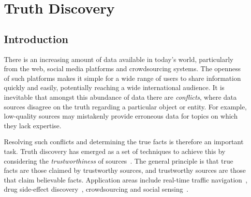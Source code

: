 \chapter{Truth Discovery}
\label{chapter_td}

\section{Introduction}
\label{td_sec_introduction}

There is an increasing amount of data available in today's world, particularly
from the web, social media platforms and crowdsourcing systems. The openness of
such platforms makes it simple for a wide range of users to share information
quickly and easily, potentially reaching a wide international audience. It is
inevitable that amongst this abundance of data there are \emph{conflicts},
where data sources disagree on the truth regarding a particular object or
entity. For example, low-quality sources may mistakenly provide erroneous data
for topics on which they lack expertise.

Resolving such conflicts and determining the true facts is therefore an
important task. Truth discovery has emerged as a set of techniques to achieve
this by considering the \emph{trustworthiness} of
sources~\cite{li_survey_2016,gupta2011survey,berti2015veracity}. The general principle is that
true facts are those claimed by trustworthy sources, and trustworthy sources
are those that claim believable facts. Application areas include real-time
traffic navigation~\cite{du2019}, drug side-effect discovery~\cite{ma2017},
crowdsourcing and social
sensing~\cite{zhang_robust_2016,wang_truth_2012,ma_faitcrowd_2015}.





